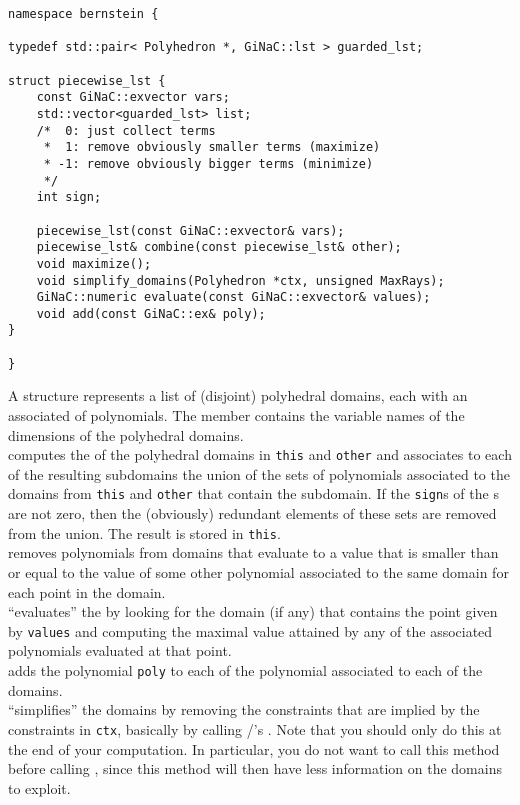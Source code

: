 \begin{verbatim}
namespace bernstein {

typedef std::pair< Polyhedron *, GiNaC::lst > guarded_lst;

struct piecewise_lst {
    const GiNaC::exvector vars;
    std::vector<guarded_lst> list;
    /*  0: just collect terms
     *  1: remove obviously smaller terms (maximize)
     * -1: remove obviously bigger terms (minimize)
     */
    int sign;

    piecewise_lst(const GiNaC::exvector& vars);
    piecewise_lst& combine(const piecewise_lst& other);
    void maximize();
    void simplify_domains(Polyhedron *ctx, unsigned MaxRays);
    GiNaC::numeric evaluate(const GiNaC::exvector& values);
    void add(const GiNaC::ex& poly);
}

}
\end{verbatim}
A  structure represents a list of (disjoint)
polyhedral domains, each with an associated 
of polynomials.
The  member contains the variable names of the
dimensions of the polyhedral domains.
\\
 computes the 
of the polyhedral domains in \verb+this+ and \verb+other+ and associates
to each of the resulting subdomains the union of the sets of polynomials
associated to the domains from \verb+this+ and \verb+other+ that contain
the subdomain.
If the \verb+sign+s of the s are not zero,
then the (obviously) redundant elements of these sets are removed
from the union.
The result is stored in \verb+this+.
\\
 removes polynomials from domains that evaluate
to a value that is smaller than or equal to the value of some
other polynomial associated to the same domain for each point in the domain.
\\
 ``evaluates'' the 
by looking for the domain (if any) that contains the point given by
\verb+values+ and computing the maximal value attained by any of the
associated polynomials evaluated at that point.
\\
 adds the polynomial \verb+poly+
to each of the polynomial associated to each of the domains.
\\
 ``simplifies'' the domains
by removing the constraints that are implied by the constraints
in \verb+ctx+, basically by calling \PolyLib/'s
.  Note that you should only do this
at the end of your computation.  In particular, you do not
want to call this method before calling
, since this method will then
have less information on the domains to exploit.


